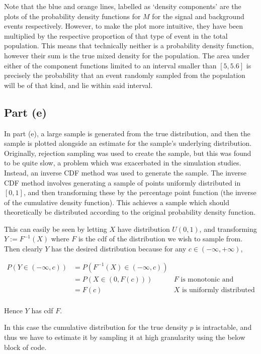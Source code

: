 \documentclass[12pt]{article}
\begin{document}
Note that the blue and orange lines, labelled as `density components' are the plots of the probability density functions for $M$ for the signal and background events respectively.
However, to make the plot more intuitive, they have been multiplied by the respective proportion of that type of event in the total population.
This means that technically neither is a probability density function, however their sum is the true mixed density for the population.
The area under either of the component functions limited to an interval smaller than $[5, 5.6]$ is precisely the probability that an event randomly sampled from the population will be of that kind, and lie within said interval.

\subsection*{Part (e)}

In part (e), a large sample is generated from the true distribution, and then the sample is plotted alongside an estimate for the sample's underlying distribution.
Originally, rejection sampling was used to create the sample, but this was found to be quite slow, a problem which was exacerbated in the simulation studies.
Instead, an inverse CDF method was used to generate the sample.
The inverse CDF method involves generating a sample of points uniformly distributed in $[0, 1]$, and then transforming these by the percentage point function (the inverse of the cumulative density function).
This achieves a sample which should theoretically be distributed according to the original probability density function.

This can easily be seen by letting $X$ have distribution $U(0,1)$, and transforming $Y:=F^{-1}(X)$ where $F$ is the cdf of the distribution we wish to sample from.
Then clearly $Y$ has the desired distribution because for any $c\in(-\infty,+\infty)$,

\begin{align*}
    P(Y\in(-\infty, c)) & = P(F^{-1}(X)\in(-\infty, c)) \\
                        & = P(X\in(0, F(c))) & \text{$F$ is monotonic and increasing}\\
                        & = F(c) & \text{$X$ is uniformly distributed}\\
\end{align*}

Hence $Y$ has cdf $F$.

In this case the cumulative distribution for the true density $p$ is intractable, and thus we have to estimate it by sampling it at high granularity using the below block of code.
\end{document}
